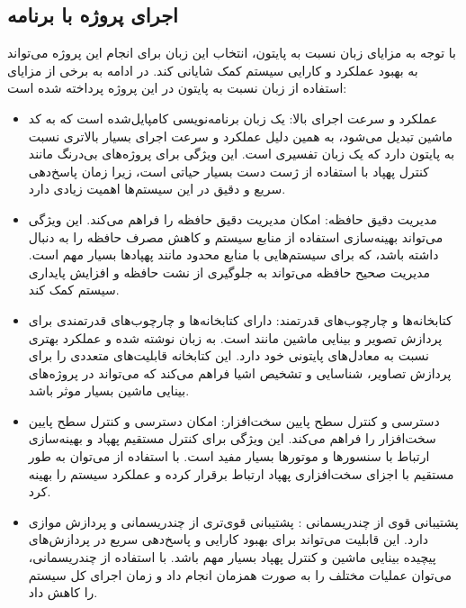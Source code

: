 \subsection{اجرای پروژه با برنامه }
با توجه به مزایای زبان  نسبت به پایتون، انتخاب این زبان برای انجام این پروژه می‌تواند به بهبود عملکرد و کارایی سیستم کمک شایانی کند. در ادامه به برخی از مزایای استفاده از زبان  نسبت به پایتون در این پروژه پرداخته شده است:

\begin{itemize}
    \item عملکرد و سرعت اجرای بالا:  یک زبان برنامه‌نویسی کامپایل‌شده است که به کد ماشین تبدیل می‌شود، به همین دلیل عملکرد و سرعت اجرای بسیار بالاتری نسبت به پایتون دارد که یک زبان تفسیری است. این ویژگی
    برای پروژه‌های بی‌درنگ مانند کنترل پهپاد با استفاده از ژست دست بسیار حیاتی است، زیرا زمان پاسخ‌دهی سریع و دقیق در این سیستم‌ها اهمیت زیادی دارد.
    \item مدیریت دقیق حافظه:  امکان مدیریت دقیق حافظه را فراهم می‌کند. این ویژگی می‌تواند بهینه‌سازی استفاده از منابع سیستم و کاهش مصرف حافظه را به دنبال داشته باشد، که برای سیستم‌هایی 
    با منابع محدود مانند پهپادها بسیار مهم است. مدیریت صحیح حافظه می‌تواند به جلوگیری از نشت حافظه و افزایش پایداری سیستم کمک کند.
    \item کتابخانه‌ها و چارچوب‌های قدرتمند:  دارای کتابخانه‌ها و چارچوب‌های قدرتمندی برای پردازش تصویر و بینایی ماشین مانند  است.  به زبان  نوشته شده
    و عملکرد بهتری نسبت به معادل‌های پایتونی خود دارد. این کتابخانه قابلیت‌های متعددی را برای پردازش تصاویر، شناسایی و تشخیص اشیا فراهم می‌کند که می‌تواند در پروژه‌های بینایی ماشین بسیار موثر باشد.
    \item دسترسی و کنترل سطح پایین سخت‌افزار:  امکان دسترسی و کنترل سطح پایین سخت‌افزار را فراهم می‌کند. این ویژگی برای کنترل مستقیم پهپاد و بهینه‌سازی ارتباط با سنسورها 
    و موتورها بسیار مفید است. با استفاده از  می‌توان به طور مستقیم با اجزای سخت‌افزاری پهپاد ارتباط برقرار کرده و عملکرد سیستم را بهینه کرد.
    \item  پشتیبانی قوی از چندریسمانی :  پشتیبانی قوی‌تری از چندریسمانی و پردازش موازی دارد. این قابلیت می‌تواند برای بهبود کارایی و پاسخ‌دهی سریع در پردازش‌های پیچیده بینایی ماشین 
    و کنترل پهپاد بسیار مهم باشد. با استفاده از چندریسمانی، می‌توان عملیات مختلف را به صورت همزمان انجام داد و زمان اجرای کل سیستم را کاهش داد.
\end{itemize}

